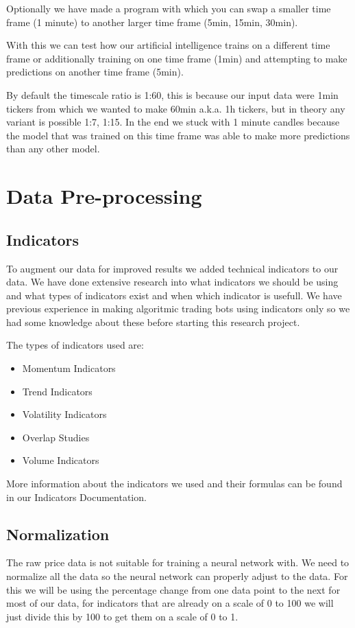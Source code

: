 \documentclass[12pt,a4paper]{article}
\begin{document}
Optionally we have made a program with which you can swap a smaller time frame (1 minute) to another larger time frame (5min, 15min, 30min).

With this we can test how our artificial intelligence trains on a different time frame or additionally training on one time frame (1min) and attempting to make predictions on another time frame (5min).

By default the timescale ratio is 1:60, this is because our input data were 1min tickers from which we wanted to make 60min a.k.a. 1h tickers, but in theory any variant is possible 1:7, 1:15.
In the end we stuck with 1 minute candles because the model that was trained on this time frame was able to make more predictions than any other model.

\section{Data Pre-processing}

\subsection{Indicators}

To augment our data for improved results we added technical indicators to our data. We have done extensive research into what indicators we should be using and what types of indicators exist and when which indicator is usefull. We have previous experience in making algoritmic trading bots using indicators only so we had some knowledge about these before starting this research project.

The types of indicators used are: 
\begin{itemize}
    \item Momentum Indicators
    \item Trend Indicators
    \item Volatility Indicators
    \item Overlap Studies
    \item Volume Indicators
\end{itemize}
More information about the indicators we used and their formulas can be found in our Indicators Documentation.

\newpage
\subsection{Normalization}

The raw price data is not suitable for training a neural network with. We need to normalize all the data so the neural network can properly adjust to the data. For this we will be using the percentage change from one data point to the next for most of our data, for indicators that are already on a scale of 0 to 100 we will just divide this by 100 to get them on a scale of 0 to 1.
\end{document}
